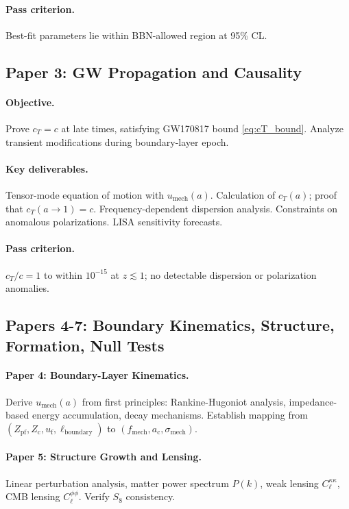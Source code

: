 \documentclass[11pt,a4paper]{article}
\newcommand{\ac}{a_{\mathrm{c}}}
\newcommand{\sigmamech}{\sigma_{\mathrm{mech}}}
\newcommand{\fmech}{f_{\mathrm{mech}}}
\newcommand{\umech}{u_{\mathrm{mech}}}
\newcommand{\Zpf}{Z_{\mathrm{pf}}}
\newcommand{\Zcond}{Z_{\mathrm{c}}}
\newcommand{\uf}{u_{\mathrm{f}}}
\theoremstyle{definition}
\begin{document}
\paragraph{Pass criterion.}
Best-fit parameters lie within BBN-allowed region at 95\% CL.

\subsection{Paper 3: GW Propagation and Causality}
\label{sec:paper3}

\paragraph{Objective.}
Prove $c_T = c$ at late times, satisfying GW170817 bound \eqref{eq:cT_bound}. Analyze transient modifications during boundary-layer epoch.

\paragraph{Key deliverables.}
Tensor-mode equation of motion with $\umech(a)$. Calculation of $c_T(a)$; proof that $c_T(a \to 1) = c$. Frequency-dependent dispersion analysis. Constraints on anomalous polarizations. LISA sensitivity forecasts.

\paragraph{Pass criterion.}
$c_T/c = 1$ to within $10^{-15}$ at $z \lesssim 1$; no detectable dispersion or polarization anomalies.

\subsection{Papers 4-7: Boundary Kinematics, Structure, Formation, Null Tests}
\label{sec:papers4-7}

\paragraph{Paper 4: Boundary-Layer Kinematics.}
Derive $\umech(a)$ from first principles: Rankine-Hugoniot analysis, impedance-based energy accumulation, decay mechanisms. Establish mapping from $(\Zpf, \Zcond, \uf, \ell_{\mathrm{boundary}})$ to $(\fmech, \ac, \sigmamech)$.

\paragraph{Paper 5: Structure Growth and Lensing.}
Linear perturbation analysis, matter power spectrum $P(k)$, weak lensing $C_\ell^{\kappa\kappa}$, CMB lensing $C_\ell^{\phi\phi}$. Verify $S_8$ consistency.
\end{document}
